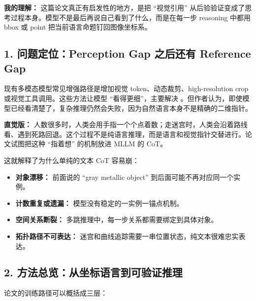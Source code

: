 \begin{summarybox}
\textbf{我的理解：} 这篇论文真正有启发性的地方，是把 ``视觉引用'' 从后验验证变成了思考过程本身。模型不是最后再说自己看到了什么，而是在每一步 reasoning 中都用 bbox 或 point 把当前语言命题钉回图像坐标系。
\end{summarybox}

\subsection{1. 问题定位：Perception Gap 之后还有 Reference Gap}

现有多模态模型常见增强路径是增加视觉 token、动态裁剪、high-resolution crop 或视觉工具调用。这些方法让模型 ``看得更细''，主要解决 。但作者认为，即使模型已经看清楚了，复杂推理仍然会失败，因为自然语言本身不是精确的二维指针。

\begin{intubox}
\textbf{直觉版：} 人数很多时，人类会用手指一个个点着数；走迷宫时，人类会沿着路线看、遇到死路回退。这个过程不是纯语言推理，而是语言和视觉指针交替进行。论文试图把这种 ``指着想'' 的机制放进 MLLM 的 CoT。
\end{intubox}

这就解释了为什么单纯的文本 CoT 容易崩：

\begin{itemize}[leftmargin=1.5em]
  \item \textbf{对象漂移：} 前面说的 ``gray metallic object'' 到后面可能不再对应同一个实例。
  \item \textbf{计数重复或遗漏：} 模型没有稳定的一实例一锚点机制。
  \item \textbf{空间关系断裂：} 多跳推理中，每一步关系都需要绑定到具体对象。
  \item \textbf{拓扑路径不可表达：} 迷宫和曲线追踪需要一串位置状态，纯文本很难忠实表达。
\end{itemize}

\subsection{2. 方法总览：从坐标语言到可验证推理}

论文的训练路径可以概括成三层：

